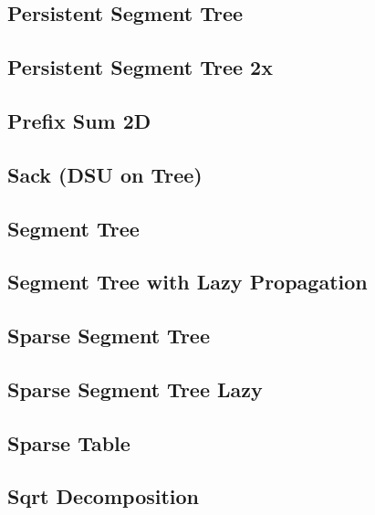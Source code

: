 \subsection{Persistent Segment Tree}
\raggedbottom
\hrulefill
\subsection{Persistent Segment Tree 2x}
\raggedbottom
\hrulefill
\subsection{Prefix Sum 2D}
\raggedbottom
\hrulefill
\subsection{Sack (DSU on Tree)}
\raggedbottom
\hrulefill
\subsection{Segment Tree}
\raggedbottom
\hrulefill
\subsection{Segment Tree with Lazy Propagation}
\raggedbottom
\hrulefill
\subsection{Sparse Segment Tree}
\raggedbottom
\hrulefill
\subsection{Sparse Segment Tree Lazy}
\raggedbottom
\hrulefill
\subsection{Sparse Table}
\raggedbottom
\hrulefill
\subsection{Sqrt Decomposition}
\raggedbottom
\hrulefill

